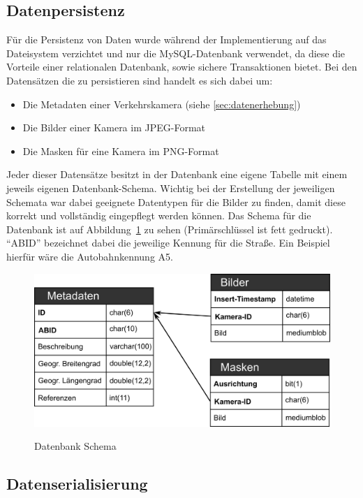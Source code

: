 \subsection{Datenpersistenz}
Für die Persistenz von Daten wurde während der Implementierung auf das Dateisystem verzichtet und nur die MySQL-Datenbank verwendet, da diese die Vorteile einer relationalen Datenbank, sowie sichere Transaktionen bietet.
Bei den Datensätzen die zu persistieren sind handelt es sich dabei um:
\begin{itemize}
\item{Die Metadaten einer Verkehrskamera (siehe \ref{sec:datenerhebung})}
\item{Die Bilder einer Kamera im JPEG-Format}
\item{Die Masken für eine Kamera im PNG-Format}
\end{itemize}
Jeder dieser Datensätze besitzt in der Datenbank eine eigene Tabelle mit einem jeweils eigenen Datenbank-Schema. 
Wichtig bei der Erstellung der jeweiligen Schemata war dabei geeignete Datentypen für die Bilder zu finden, damit diese korrekt und vollständig eingepflegt werden können.
Das Schema für die Datenbank ist auf Abbildung~\ref{fig:dbschema} zu sehen (Primärschlüssel ist fett gedruckt). "`ABID"' bezeichnet dabei die jeweilige Kennung für die Straße. Ein Beispiel hierfür wäre die Autobahnkennung A5.
\begin{figure}[ht]
   \centering
     \includegraphics[width=15cm]{Bilder/db-schema} \\
 \caption{Datenbank Schema}
 \label{fig:dbschema}
\end{figure}

\subsection{Datenserialisierung}



